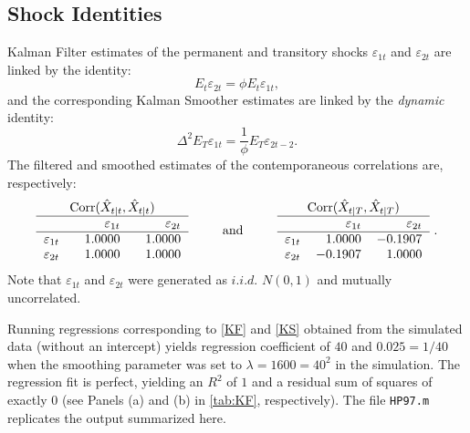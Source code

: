 \documentclass[a4paper,final,12pt]{article}
\begin{document}
\subsection{Shock Identities}

Kalman Filter estimates of the permanent and transitory shocks $\varepsilon
_{1t}$ and $\varepsilon _{2t}$ are linked by the identity:%
\begin{equation}
E_{t}\varepsilon _{2t}=\phi E_{t}\varepsilon _{1t},  \label{KF}
\end{equation}%
and the corresponding Kalman Smoother estimates are linked by the \emph{%
dynamic} identity: 
\begin{equation}
\Delta ^{2}E_{T}\varepsilon _{1t}=\frac{1}{\phi }E_{T}\varepsilon _{2t-2}.
\label{KS}
\end{equation}%
The filtered and smoothed estimates of the contemporaneous correlations are,
respectively: 
\begin{equation*}
\begin{tabular}{lrr}
\multicolumn{3}{c}{$\mathrm{Corr}(\hat{X}_{t|t},\hat{X}_{t|t})$} \\ \hline
& {$\varepsilon _{1t}$} & {$\varepsilon _{2t}$} \\ \hline
{$\varepsilon _{1t}$} & $\phantom{-}1.0000$ & $\phantom{-}1.0000$ \\ 
{$\varepsilon _{2t}$} & $1.0000$ & $1.0000$%
\end{tabular}%
\text{ \ \ \ \ \ \ \ and \ \ \ \ \ \ \ }%
\begin{tabular}{lrr}
\multicolumn{3}{c}{$\mathrm{Corr}(\hat{X}_{t|T},\hat{X}_{t|T})$} \\ \hline
& {$\varepsilon _{1t}$} & {$\varepsilon _{2t}$} \\ \hline
{$\varepsilon _{1t}$} & $1.0000$ & $-0.1907$ \\ 
{$\varepsilon _{2t}$} & $-0.1907$ & $1.0000$%
\end{tabular}%
~\text{.}
\end{equation*}%
Note that {$\varepsilon _{1t}$ and $\varepsilon _{2t}$ }were generated as $%
i.i.d.$ $N(0,1)$ and mutually uncorrelated.

Running regressions corresponding to \ref{KF} and \ref{KS} obtained from the
simulated data (without an intercept) yields regression coefficient of $40$
and $0.025=1/40$ when the smoothing parameter was set to $\lambda
=1600=40^{2}$ in the simulation. The regression fit is perfect, yielding an $%
R^{2}$ of $1$ and a residual sum of squares of exactly $0$ (see Panels (a)
and (b) in \autoref{tab:KF}, respectively). The file \texttt{HP97.m}
replicates the output summarized here.
\end{document}
